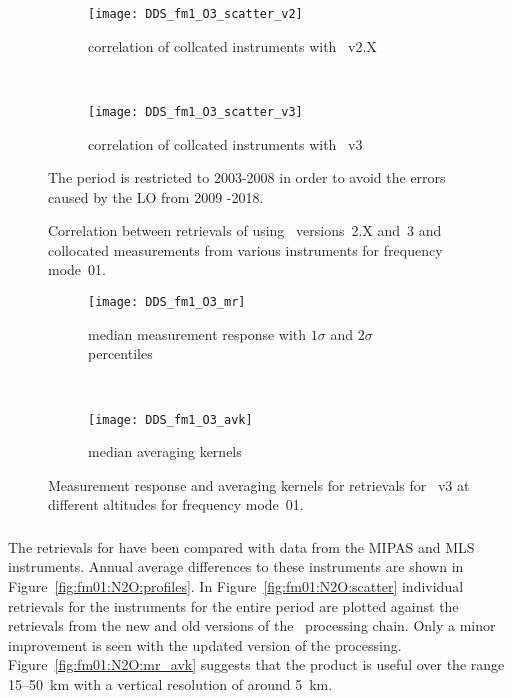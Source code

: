 \begin{figure}[tbhp]
    \centering
    \begin{subfigure}[b]{0.49\textwidth}
        \texttt{[image: DDS\_fm1\_O3\_scatter\_v2]}
        \caption{correlation of collcated instruments with \smr~v2.X}
        \label{fig:fm01:O3:scatter:v2}
    \end{subfigure}
    \,
    \begin{subfigure}[b]{0.49\textwidth}
        \texttt{[image: DDS\_fm1\_O3\_scatter\_v3]}
        \caption{correlation of collcated instruments with \smr~v3}
        \label{fig:fm01:O3:scatter:v3}
    \end{subfigure}
    \caption{Correlation between retrievals of  using \smr\
    versions~2.X and~3 and collocated measurements from various instruments
    for frequency mode~01.} The period is restricted to 2003-2008 in order to avoid the errors caused by the LO from 2009 -2018.
    \label{fig:fm01:O3:scatter}
\end{figure}

\begin{figure}[tbhp]
    \centering
    \begin{subfigure}[b]{0.49\textwidth}
        \texttt{[image: DDS\_fm1\_O3\_mr]}
        \caption{median measurement response with $1\sigma$ and $2\sigma$
        percentiles}
        \label{fig:fm01:O3:mr}
    \end{subfigure}
    \,
    \begin{subfigure}[b]{0.49\textwidth}
        \texttt{[image: DDS\_fm1\_O3\_avk]}
        \caption{median averaging kernels\newline~}
        \label{fig:fm01:O3:avk}
    \end{subfigure}
    \caption{Measurement response and averaging kernels for 
    retrievals for \smr~v3 at different altitudes for frequency mode~01.}
    \label{fig:fm01:O3:mr_avk}
\end{figure}



\subsubsection{}
\label{sec:fm01:comparison:N2O}
The retrievals for \chem{N_2O} have been compared with data from the MIPAS and
MLS instruments. Annual average differences to these instruments are shown in
Figure~\ref{fig:fm01:N2O:profiles}. In Figure~\ref{fig:fm01:N2O:scatter}
individual retrievals for the instruments for the entire period are plotted
against the retrievals from the new and old versions of the \smr\ processing
chain. Only a minor improvement is seen with the updated version of the
processing. Figure~\ref{fig:fm01:N2O:mr_avk} suggests that the product is
useful over the range 15--50~km with a vertical resolution of around 5~km.


